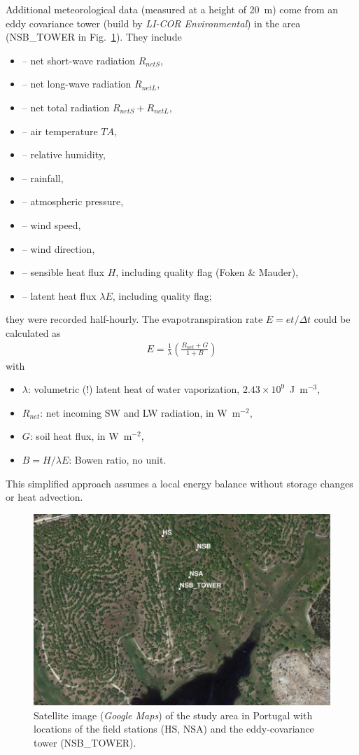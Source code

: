 \documentclass{scrreprt}
\newenvironment{denseitem}{
  \begin{itemize}
    \setlength{\itemsep}{0pt}
    \setlength{\parskip}{0pt}
    \setlength{\parsep}{0pt}
}{
  \end{itemize}
}
\begin{document}
Additional meteorological data (measured at a height of 20~m) come from an eddy covariance tower (build by \emph{LI-COR Environmental}) in the area (NSB\_TOWER in Fig.~\ref{fig:map_coruche}).
They include
\begin{denseitem}
  \item[--] net short-wave radiation $R_{netS}$,
  \item[--] net long-wave radiation $R_{netL}$,
  \item[--] net total radiation $R_{netS} + R_{netL}$,
  \item[--] air temperature $TA$,
  \item[--] relative humidity,
  \item[--] rainfall,
  \item[--] atmospheric pressure,
  \item[--] wind speed,
  \item[--] wind direction,
  \item[--] sensible heat flux $H$, including quality flag (Foken \& Mauder),
  \item[--] latent heat flux $\lambda E$, including quality flag;
\end{denseitem}
%
they were recorded half-hourly.
The evapotranspiration rate $E = et / \Delta t$ could be calculated as
\begin{align} \label{eq:bowen}
  E = \frac{1}{\lambda} \left( \frac{R_{net} + G}{1 + B} \right)
\end{align}
%
with
\begin{denseitem}
  \item[] $\lambda$: volumetric (!) latent heat of water vaporization, $2.43 \times 10^9$~J~m$^{-3}$,
  \item[] $R_{net}$: net incoming SW and LW radiation, in W~m$^{-2}$,
  \item[] $G$: soil heat flux, in W~m$^{-2}$,
  \item[] $B = H / \lambda E$: Bowen ratio, no unit.
\end{denseitem}
%
This simplified approach \citep{taylor72} assumes a local energy balance without storage changes or heat advection.

\begin{figure}[t]
  \centering
  \includegraphics[width=0.7\hsize]{./fig/map_coruche}
  \caption{Satellite image (\emph{Google Maps}) of the study area in Portugal with locations of the field stations (HS, NSA) and the eddy-covariance tower (NSB\_TOWER).}
  \label{fig:map_coruche}
\end{figure}
\end{document}
